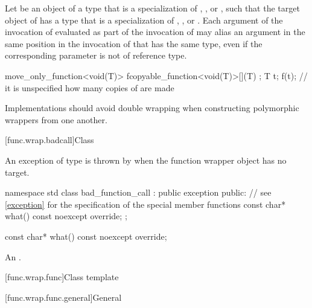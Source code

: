 \pnum
Let  be an object of a type that is a specialization of
, , or ,
such that the target object  of  has a type that
is a specialization of
, , or .
Each argument of the
invocation of  evaluated as part of the invocation of 
may alias an argument in the same position in the invocation of  that
has the same type, even if the corresponding parameter is not of reference type.
\begin{example}
\begin{codeblock}
move_only_function<void(T)>
  f{copyable_function<void(T)>{[](T) {}}};
T t;
f(t);                               // it is unspecified how many copies of  are made
\end{codeblock}
\end{example}

\pnum
\recommended
Implementations should avoid double wrapping when
constructing polymorphic wrappers from one another.

[func.wrap.badcall]{Class }%
%

\pnum
An exception of type  is thrown by
when the function wrapper object has no target.

\begin{codeblock}
namespace std {
  class bad_function_call : public exception {
  public:
    // see \ref{exception} for the specification of the special member functions
    const char* what() const noexcept override;
  };
}
\end{codeblock}

%
\begin{itemdecl}
const char* what() const noexcept override;
\end{itemdecl}

\begin{itemdescr}
\pnum
\returns
An
 \ntbs{}.
\end{itemdescr}

[func.wrap.func]{Class template }

[func.wrap.func.general]{General}
%

